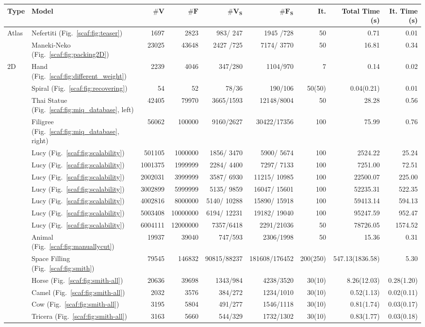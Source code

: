 \begin{table}[t]
	\centering
	\begin{adjustbox}{width=\columnwidth,totalheight=\textheight,keepaspectratio}
	\begin{tabular}{llrrrrrrr}
\textbf{{Type}} &\textbf{Model} & $\mathbf{\#V}$	& $\mathbf{\#F}$ & $\mathbf{\#V_S}$	& $\mathbf{\#F_S}$ & \textbf{It.} & \textbf{{Total Time (s)}} & \textbf{{It. Time (s)}}\\
\hline
\multirow{2}{*}{Atlas}&Nefertiti (Fig.~\ref{scaf:fig:teaser})
&1697	&2823	&983/	247&	1945	/728&	50&	0.71&0.01\\
&Maneki-Neko (Fig.~\ref{scaf:fig:packing2D})
&23025	&43648	&2427	/725&	7174/	3770&	50&	16.81&0.34\\
\hline
\multirow{12}{*}{2D}
&Hand (Fig.~\ref{scaf:fig:different_weight})
&2239&4046&347/280&1104/970&7&0.14&0.02\\
&Spiral (Fig.~\ref{scaf:fig:recovering})
&54&52&78/36&190/106&50(50)&0.04(0.21)&0.01\\
&Thai Statue (Fig.~\ref{scaf:fig:miq_database}, left)
&42405&79970    &   3665/1593&12148/8004&50&28.28&0.56\\
&Filigree (Fig.~\ref{scaf:fig:miq_database}, right)
&56062&100000&9160/2627&30422/17356&100&75.99&0.76\\
&Lucy (Fig.~\ref{scaf:fig:scalability})&	501105&	1000000&	1856/	3470&	5900/	5674&	100&	2524.22&25.24\\
&Lucy (Fig.~\ref{scaf:fig:scalability})&	1001375&	1999999&	2284/	4400&	7297/	7133&	100&	7251.00&72.51\\
&Lucy (Fig.~\ref{scaf:fig:scalability})&	2002031&	3999999&	3587/	6930&	11215/	10985&	100&	22500.07&225.00\\
&Lucy (Fig.~\ref{scaf:fig:scalability})&	3002899&	5999999&	5135/	9859&	16047/	15601&	100&	52235.31&522.35\\
&Lucy (Fig.~\ref{scaf:fig:scalability})&	4002816&	8000000&	5140/	10288&	15890/	15918&	100&	59413.14&594.13\\
&Lucy (Fig.~\ref{scaf:fig:scalability})&	5003408&	10000000&	6194/	12231&	19182/	19040&	100&	95247.59&952.47\\
&Lucy (Fig.~\ref{scaf:fig:scalability})&6004111&12000000 & 7357/6418 & 2291/21036 &50 & 78726.05 &1574.52\\
&Animal (Fig.~\ref{scaf:fig:manuallycut})
&19937&39040&747/593&2306/1998&50&15.36&0.31\\
&Space Filling (Fig.~\ref{scaf:fig:smith})
&79545&146832&90815/88237&181608/176452&200(250)&547.13(1836.58)&5.30\\
&Horse (Fig.~\ref{scaf:fig:smith-all}) & 20636 & 39698 & 1343/984 & 4238/3520 & 30(10) & 8.26(12.03) & 0.28(1.20) \\
&Camel (Fig.~\ref{scaf:fig:smith-all}) & 2032 & 3576 & 384/272 & 1234/1010 & 30(10) & 0.52(1.13) & 0.02(0.11) \\
&Cow (Fig.~\ref{scaf:fig:smith-all}) & 3195 & 5804 & 491/277 & 1546/1118 & 30(10) & 0.81(1.74) & 0.03(0.17) \\
&Tricera (Fig.~\ref{scaf:fig:smith-all}) & 3163 & 5660 & 544/329 & 1732/1302 & 30(10) & 0.83(1.77) & 0.03(0.18) \\
\hline


\end{tabular}
\end{adjustbox}
\end{table}
